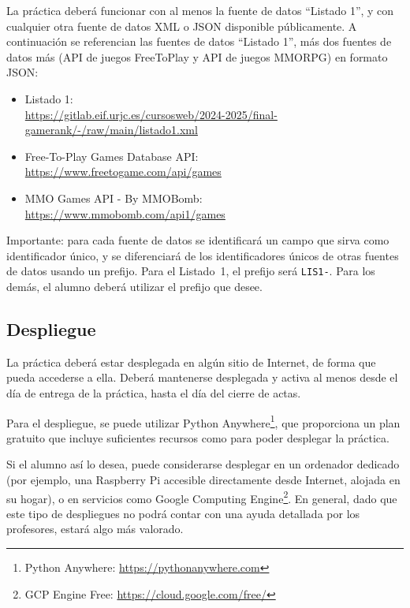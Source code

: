 La práctica deberá funcionar con al menos la fuente de datos ``Listado 1'', y con cualquier otra fuente de datos XML o JSON disponible públicamente. A continuación se referencian las fuentes de datos ``Listado 1'', más dos fuentes de datos más (API de juegos FreeToPlay y API de juegos MMORPG) en formato JSON:

\begin{itemize}
\item Listado 1: \\
  \url{https://gitlab.eif.urjc.es/cursosweb/2024-2025/final-gamerank/-/raw/main/listado1.xml}
\item Free-To-Play Games Database API: \\
  \url{https://www.freetogame.com/api/games}
\item MMO Games API - By MMOBomb: \\
  \url{https://www.mmobomb.com/api1/games}
\end{itemize}

Importante: para cada fuente de datos se identificará un campo que sirva como identificador único, y se diferenciará de los identificadores únicos de otras fuentes de datos usando un prefijo. Para el Listado~1, el prefijo será \verb|LIS1-|. Para los demás, el alumno deberá utilizar el prefijo que desee.

\subsection{Despliegue}
\label{sec:practica-2025-05:despliegue}

La práctica deberá estar desplegada en algún sitio de Internet, de forma que pueda accederse a ella. Deberá mantenerse desplegada y activa al menos desde el día de entrega de la práctica, hasta el día del cierre de actas.

Para el despliegue, se puede utilizar Python Anywhere\footnote{Python Anywhere: \url{https://pythonanywhere.com}}, que proporciona un plan gratuito que incluye suficientes recursos como para poder desplegar la práctica.

Si el alumno así lo desea, puede considerarse desplegar en un ordenador dedicado (por ejemplo, una Raspberry Pi accesible directamente desde Internet, alojada en su hogar), o en servicios como Google Computing Engine\footnote{GCP Engine Free: \url{https://cloud.google.com/free/}}. En general, dado que este tipo de despliegues no podrá contar con una ayuda detallada por los profesores, estará algo más valorado.

